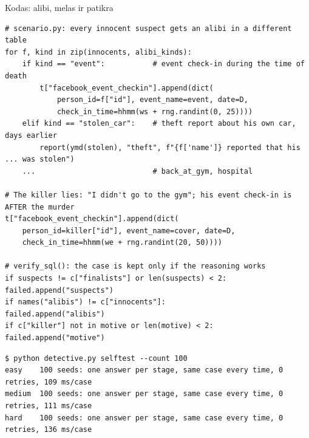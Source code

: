 \documentclass[hyperref={breaklinks=true},fleqn,mathserif]{beamer}
\begin{document}
\begin{frame}[fragile]{Kodas: alibi, melas ir patikra}

\vspace{-1mm}
\begin{lstlisting}[basicstyle=\ttfamily\fontsize{6.6}{7.8}\selectfont]
# scenario.py: every innocent suspect gets an alibi in a different table
for f, kind in zip(innocents, alibi_kinds):
    if kind == "event":           # event check-in during the time of death
        t["facebook_event_checkin"].append(dict(
            person_id=f["id"], event_name=event, date=D,
            check_in_time=hhmm(ws + rng.randint(0, 25))))
    elif kind == "stolen_car":    # theft report about his own car, days earlier
        report(ymd(stolen), "theft", f"{f['name']} reported that his ... was stolen")
    ...                           # back_at_gym, hospital

# The killer lies: "I didn't go to the gym"; his event check-in is AFTER the murder
t["facebook_event_checkin"].append(dict(
    person_id=killer["id"], event_name=cover, date=D,
    check_in_time=hhmm(we + rng.randint(20, 50))))

# verify_sql(): the case is kept only if the reasoning works
if suspects != c["finalists"] or len(suspects) < 2: failed.append("suspects")
if names("alibis") != c["innocents"]:               failed.append("alibis")
if c["killer"] not in motive or len(motive) < 2:    failed.append("motive")
\end{lstlisting}

\vspace{-2mm}
\begin{lstlisting}[style=term]
$ python detective.py selftest --count 100
easy    100 seeds: one answer per stage, same case every time, 0 retries, 109 ms/case
medium  100 seeds: one answer per stage, same case every time, 0 retries, 111 ms/case
hard    100 seeds: one answer per stage, same case every time, 0 retries, 136 ms/case
\end{lstlisting}

\end{frame}
\end{document}
